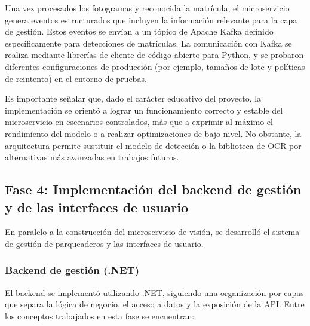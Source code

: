 Una vez procesados los fotogramas y reconocida la matrícula, el microservicio genera eventos estructurados que incluyen la información relevante para la capa de gestión. Estos eventos se envían a un tópico de Apache Kafka definido específicamente para detecciones de matrículas. La comunicación con Kafka se realiza mediante librerías de cliente de código abierto para Python, y se probaron diferentes configuraciones de producción (por ejemplo, tamaños de lote y políticas de reintento) en el entorno de pruebas.

Es importante señalar que, dado el carácter educativo del proyecto, la implementación se orientó a lograr un funcionamiento correcto y estable del microservicio en escenarios controlados, más que a exprimir al máximo el rendimiento del modelo o a realizar optimizaciones de bajo nivel. No obstante, la arquitectura permite sustituir el modelo de detección o la biblioteca de OCR por alternativas más avanzadas en trabajos futuros.

\subsection{Fase 4: Implementación del backend de gestión y de las interfaces de usuario}

En paralelo a la construcción del microservicio de visión, se desarrolló el sistema de gestión de parqueaderos y las interfaces de usuario.

\subsubsection{Backend de gestión (.NET)}

El backend se implementó utilizando .NET, siguiendo una organización por capas que separa la lógica de negocio, el acceso a datos y la exposición de la API. Entre los conceptos trabajados en esta fase se encuentran:

